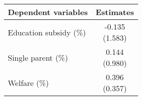 \begin{tabular}{lc}
\hline \hline
Dependent variables & Estimates \\
\hline
Education subsidy (\%) & \makecell[tc]{-0.135\\(1.583)} \\
Single parent (\%) & \makecell[tc]{0.144\\(0.980)} \\
Welfare (\%) & \makecell[tc]{0.396\\(0.357)} \\
\hline \hline
\end{tabular}